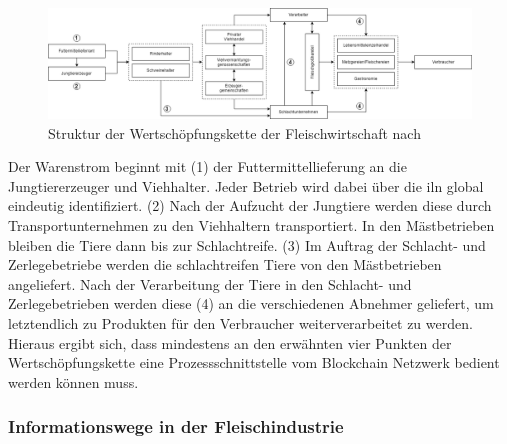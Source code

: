     \begin{figure}[h!]
        \centering
        \includegraphics[angle=90, width=0.3\linewidth]{pictures/structure-value-chain-meat-industry-numbered}
        \caption[Struktur der Wertschöpfungskette der Fleischwirtschaft]{Struktur der Wertschöpfungskette der Fleischwirtschaft nach \citet{Petersen2010, Voss2010, Beck2008}}
        \label{fig:structure-value-chain-meat-industry-numbered}
    \end{figure}

\noindent
Der Warenstrom beginnt mit (1) der Futtermittellieferung an die Jungtiererzeuger und Viehhalter. Jeder Betrieb wird dabei über die \ac{iln} global eindeutig identifiziert. (2) Nach der Aufzucht der Jungtiere werden diese durch Transportunternehmen zu den Viehhaltern transportiert. In den Mästbetrieben bleiben die Tiere dann bis zur Schlachtreife. (3) Im Auftrag der Schlacht- und Zerlegebetriebe werden die schlachtreifen Tiere von den Mästbetrieben angeliefert. Nach der Verarbeitung der Tiere in den Schlacht- und Zerlegebetrieben werden diese (4) an die verschiedenen Abnehmer geliefert, um letztendlich zu Produkten für den Verbraucher weiterverarbeitet zu werden. Hieraus ergibt sich, dass mindestens an den erwähnten vier Punkten der Wertschöpfungskette eine Prozessschnittstelle vom Blockchain Netzwerk bedient werden können muss.

\subsubsection{Informationswege in der Fleischindustrie}

